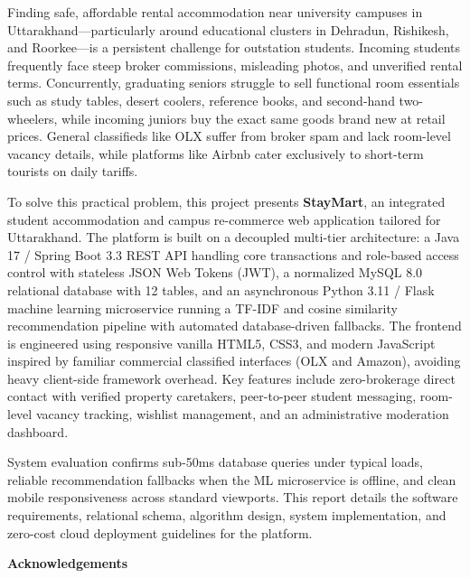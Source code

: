 \documentclass[12pt,a4paper]{report}
\begin{document}
Finding safe, affordable rental accommodation near university campuses in Uttarakhand—particularly around educational clusters in Dehradun, Rishikesh, and Roorkee—is a persistent challenge for outstation students. Incoming students frequently face steep broker commissions, misleading photos, and unverified rental terms. Concurrently, graduating seniors struggle to sell functional room essentials such as study tables, desert coolers, reference books, and second-hand two-wheelers, while incoming juniors buy the exact same goods brand new at retail prices. General classifieds like OLX suffer from broker spam and lack room-level vacancy details, while platforms like Airbnb cater exclusively to short-term tourists on daily tariffs.

To solve this practical problem, this project presents \textbf{StayMart}, an integrated student accommodation and campus re-commerce web application tailored for Uttarakhand. The platform is built on a decoupled multi-tier architecture: a Java 17 / Spring Boot 3.3 REST API handling core transactions and role-based access control with stateless JSON Web Tokens (JWT), a normalized MySQL 8.0 relational database with 12 tables, and an asynchronous Python 3.11 / Flask machine learning microservice running a TF-IDF and cosine similarity recommendation pipeline with automated database-driven fallbacks. The frontend is engineered using responsive vanilla HTML5, CSS3, and modern JavaScript inspired by familiar commercial classified interfaces (OLX and Amazon), avoiding heavy client-side framework overhead. Key features include zero-brokerage direct contact with verified property caretakers, peer-to-peer student messaging, room-level vacancy tracking, wishlist management, and an administrative moderation dashboard.

System evaluation confirms sub-50ms database queries under typical loads, reliable recommendation fallbacks when the ML microservice is offline, and clean mobile responsiveness across standard viewports. This report details the software requirements, relational schema, algorithm design, system implementation, and zero-cost cloud deployment guidelines for the platform.

\newpage
{}
\begin{center}
    {\fontsize{14pt}{16pt}\selectfont \textbf{Acknowledgements}\par}
\end{center}
\vspace{0.5cm}
\end{document}
